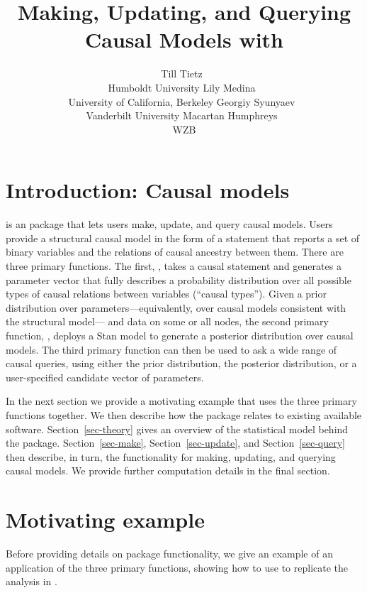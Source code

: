 \documentclass[
  11pt,
  article]{jss}
\author{Till Tietz~\orcidlink{0000-0002-2916-9059}\\Humboldt
University \And Lily Medina~\orcidlink{0009-0004-2423-524X}\\University
of California, Berkeley \AND Georgiy
Syunyaev~\orcidlink{0000-0002-4391-6313}\\Vanderbilt
University \And Macartan Humphreys~\orcidlink{0000-0001-7029-2326}\\WZB}
\title{Making, Updating, and Querying Causal Models with
\pkg{CausalQueries}}
\renewcommand{\texttt}[1]{\code{#1}}
\begin{document}
\maketitle


\section{Introduction: Causal models}\label{sec-intro}

 is an  package that lets users make,
update, and query causal models. Users provide a structural causal model
in the form of a statement that reports a set of binary variables and
the relations of causal ancestry between them. There are three primary
functions. The first, \texttt{make\_model()}, takes a causal statement
and generates a parameter vector that fully describes a probability
distribution over all possible types of causal relations between
variables (``causal types''). Given a prior distribution over
parameters---equivalently, over causal models consistent with the
structural model--- and data on some or all nodes, the second primary
function, \texttt{update\_model()}, deploys a Stan
\citep{carpenter_stan_2017} model to generate a posterior distribution
over causal models. The third primary function \texttt{query\_model()}
can then be used to ask a wide range of causal queries, using either the
prior distribution, the posterior distribution, or a user-specified
candidate vector of parameters.

In the next section we provide a motivating example that uses the three
primary functions together. We then describe how the package relates to
existing available software. Section~\ref{sec-theory} gives an overview
of the statistical model behind the package. Section~\ref{sec-make},
Section~\ref{sec-update}, and Section~\ref{sec-query} then describe, in
turn, the functionality for making, updating, and querying causal
models. We provide further computation details in the final section.

\section{Motivating example}\label{motivating-example}

Before providing details on package functionality, we give an example of
an application of the three primary functions, showing how to use
 to replicate the analysis in
\citetext{\citealp{chickering_clinicians_1996}; \citealp[see
also][]{humphreys_integrated_2023}}.
\end{document}
